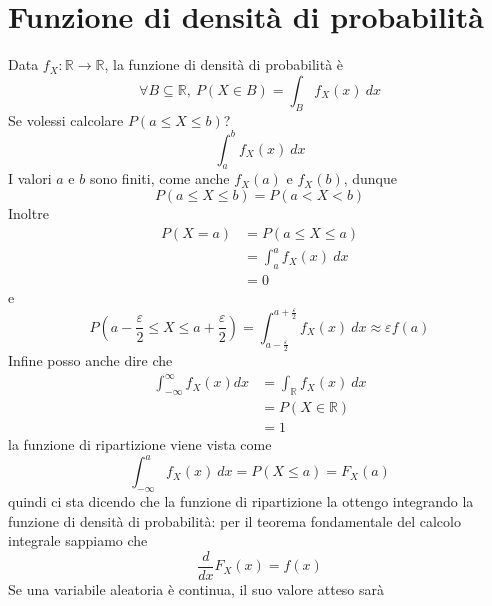 \documentclass[11pt]{report}
\begin{document}
\section{Funzione di densità di probabilità}
Data $f_X:\mathbb{R} \rightarrow \mathbb{R}$, la funzione di densità di probabilità è
\begin{equation}
    \forall B \subseteq \mathbb{R},\ P(X \in B) = \int_B f_X(x)\ dx
\end{equation}
Se volessi calcolare $P(a \leq X \leq b)$?
\begin{equation}
    \int_a^b f_X(x)\ dx
\end{equation}
I valori $a$ e $b$ sono finiti, come anche $f_X(a)$ e $f_X(b)$, dunque
\begin{equation}
    P(a \leq X \leq b) = P(a < X < b)
\end{equation}
Inoltre
\begin{equation}
    \begin{split}
        P(X = a) & = P(a \leq X \leq a)\\
        & = \int_a^a f_X(x)\ dx\\
        & = 0
    \end{split}
\end{equation}
e
\begin{equation}
    P \left( a - \frac{\varepsilon}{2} \leq X \leq a + \frac{\varepsilon}{2} \right) = \int_{a - \frac{\varepsilon}{2}}^{a + \frac{\varepsilon}{2}} f_X(x)\ dx \approx \varepsilon f(a)
\end{equation}
Infine posso anche dire che
\begin{equation}
    \begin{split}
        \int_{-\infty}^{\infty}f_X(x) dx & = \int_{\mathbb{R}} f_X(x)\ dx\\
        & = P(X \in \mathbb{R})\\
        & = 1
    \end{split}
\end{equation}
la funzione di ripartizione viene vista come
\begin{equation}
    \int_{- \infty}^{a}f_X(x)\ dx = P(X \leq a) = F_X(a)
\end{equation}
quindi ci sta dicendo che la funzione di ripartizione la ottengo integrando la funzione di densità di probabilità: per il teorema fondamentale del calcolo integrale sappiamo che
\begin{equation}
    \frac{d}{dx}F_X(x) = f(x)
\end{equation}
Se una variabile aleatoria è continua, il suo valore atteso sarà
\end{document}
